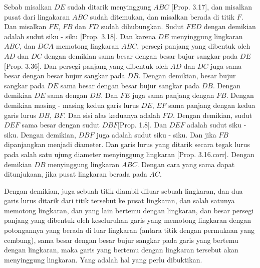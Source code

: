 \documentclass[a4paper]{book}
\begin{document}
Sebab misalkan $DE$ sudah ditarik menyinggung $ABC$ [Prop. 3.17], dan misalkan pusat
dari lingakaran $ABC$ sudah ditemukan, dan misalkan berada di titik $F$. Dan
misalkan $FE$, $FB$ dan $FD$ sudah dihubungkan. Sudut $FED$ dengan demikian adalah
sudut siku - siku [Prop. 3.18]. Dan karena $DE$ menyinggung lingkaran $ABC$, dan
$DCA$ memotong lingkaran $ABC$, persegi panjang yang dibentuk oleh $AD$ dan
$DC$ dengan demikian sama besar dengan besar bujur sangkar pada $DE$ [Prop. 3.36].
Dan persegi panjang	yang dibentuk oleh $AD$ dan $DC$ juga sama besar dengan
besar bujur sangkar pada $DB$. Dengan demikian, besar bujur sangkar pada $DE$
sama besar dengan besar bujur sangkar pada $DB$. Dengan demikian $DE$ sama dengan 
$DB$. Dan $FE$ juga sama panjang dengan $FB$. Dengan demikian masing - masing
kedua garis lurus $DE$, $EF$ sama panjang dengan kedua garis lurus 
$DB$, $BF$. Dan sisi alas keduanya adalah $FD$. Dengan demikian, sudut $DEF$
sama besar dengan sudut $DBF$[Prop. 1.8]. Dan $DEF$ adalah sudut siku - siku.
Dengan demikian, $DBF$ juga adalah sudut siku - siku. Dan jika $FB$ 
dipanjangkan menjadi diameter. Dan garis lurus yang ditarik secara tegak lurus
pada salah satu ujung diameter menyinggung lingkaran [Prop. 3.16.corr]. Dengan
demikian $DB$ menyinggung lingkaran $ABC$. Dengan cara yang sama dapat 
ditunjukaan, jika pusat lingkaran berada pada $AC$.

Dengan demikian, juga sebuah titik diambil diluar sebuah lingkaran, dan
dua garis lurus ditarik dari titik tersebut ke pusat lingkaran, dan salah
satunya memotong lingkaran, dan yang lain bertemu dengan lingkaran, dan besar
persegi panjang yang dibentuk oleh keseluruhan garis yang memotong lingkaran
dengan potongannya yang berada di luar lingkaran (antara titik dengan 
permukaan yang cembung), sama besar dengan besar bujur sangkar pada garis
yang bertemu dengan lingkaran, maka garis yang bertemu dengan lingkaran 
tersebut akan menyinggung lingkaran. Yang adalah hal yang perlu dibuktikan.

\end{document}
